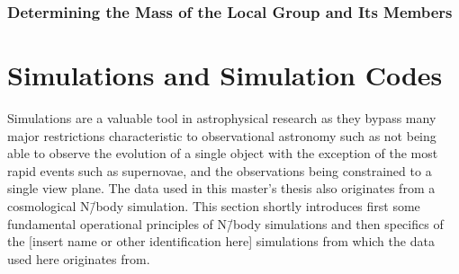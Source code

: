 \documentclass[english, oneside]{HYgradu}
\begin{document}
%
%
%
%

\subsection{Determining the Mass of the Local Group and Its Members}






\chapter{Simulations and Simulation Codes}


Simulations are a valuable tool in astrophysical research as they bypass many major restrictions characteristic to observational astronomy such as not being able to observe the evolution of a single object with the exception of the most rapid events such as supernovae, and the observations being constrained to a single view plane. The data used in this master's thesis also originates from a cosmological N\=/body simulation. This section shortly introduces first some fundamental operational principles of N\=/body simulations and then specifics of the [insert name or other identification here] %
simulations from which the data used here originates from.
\end{document}
